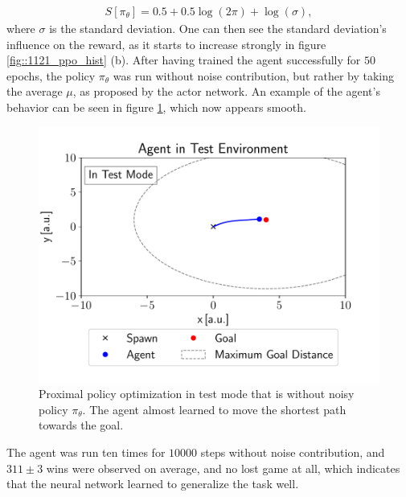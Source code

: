 \begin{align}
S[\pi_\theta] = 0.5 + 0.5\log(2\pi)+\log(\sigma),
\end{align}
where $\sigma$ is the standard deviation. One can then see the standard deviation's influence on the reward, as it starts to increase strongly in figure \ref{fig::1121_ppo_hist} (b). After having trained the agent successfully for $50$ epochs, the policy $\pi_\theta$ was run without noise contribution, but rather by taking the average $\mu$, as proposed by the actor network. An example of the agent's behavior can be seen in figure \ref{fig::1121_ppo_test}, which now appears smooth. 
\begin{figure}[h!]
	\centering
	\includegraphics[scale=.45]{chapters/11_autonomous_walking_experiments/img/test_mode.pdf}
	\caption{Proximal policy optimization in test mode that is without noisy policy $\pi_\theta$. The agent almost learned to move the shortest path towards the goal.}	
	\label{fig::1121_ppo_test}
\end{figure}
The agent was run ten times for $10000$ steps without noise contribution, and $311\pm3$ wins were observed on average, and no lost game at all, which indicates that the neural network learned to generalize the task well.
\FloatBarrier
